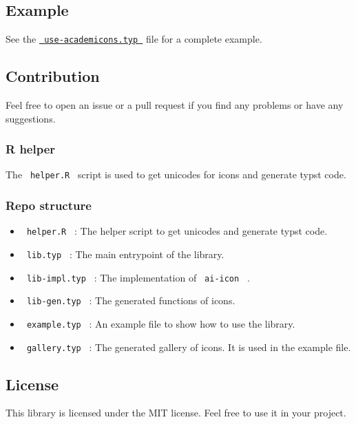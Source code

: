 \subsection{Example}\label{example}

See the
\href{https://typst.app/project/rsgOFC4YkwpN7OqtRyiXP3}{\texttt{\ use-academicons.typ\ }}
file for a complete example.

\subsection{Contribution}\label{contribution}

Feel free to open an issue or a pull request if you find any problems or
have any suggestions.

\subsubsection{R helper}\label{r-helper}

The \texttt{\ helper.R\ } script is used to get unicodes for icons and
generate typst code.

\subsubsection{Repo structure}\label{repo-structure}

\begin{itemize}
\tightlist
\item
  \texttt{\ helper.R\ } : The helper script to get unicodes and generate
  typst code.
\item
  \texttt{\ lib.typ\ } : The main entrypoint of the library.
\item
  \texttt{\ lib-impl.typ\ } : The implementation of \texttt{\ ai-icon\ }
  .
\item
  \texttt{\ lib-gen.typ\ } : The generated functions of icons.
\item
  \texttt{\ example.typ\ } : An example file to show how to use the
  library.
\item
  \texttt{\ gallery.typ\ } : The generated gallery of icons. It is used
  in the example file.
\end{itemize}

\subsection{License}\label{license}

This library is licensed under the MIT license. Feel free to use it in
your project.

